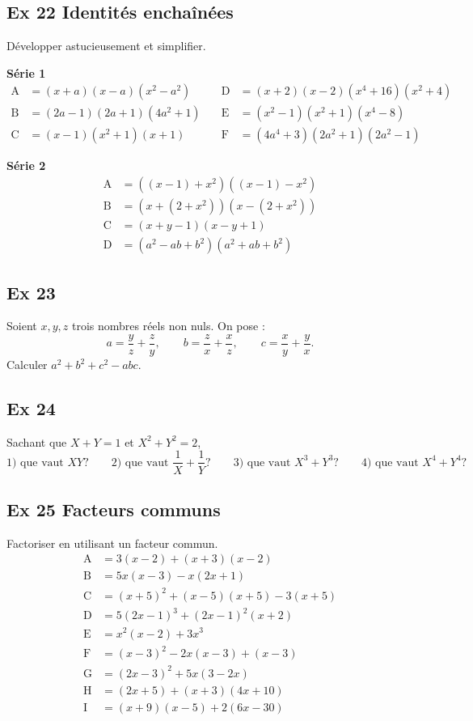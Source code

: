 \documentclass[a4paper,11pt]{article}
\begin{document}
\subsection*{Ex 22 \; Identités enchaînées}
Développer astucieusement et simplifier.

\textbf{Série 1}
\[
\begin{aligned}
\mathrm{A}&=(x+a)(x-a)(x^{2}-a^{2}) &\quad \mathrm{D}&=(x+2)(x-2)(x^{4}+16)(x^{2}+4)\\
\mathrm{B}&=(2a-1)(2a+1)(4a^{2}+1) &\quad \mathrm{E}&=(x^{2}-1)(x^{2}+1)(x^{4}-8)\\
\mathrm{C}&=(x-1)(x^{2}+1)(x+1) &\quad \mathrm{F}&=(4a^{4}+3)(2a^{2}+1)(2a^{2}-1)
\end{aligned}
\]

\textbf{Série 2}
\[
\begin{aligned}
\mathrm{A}&=((x-1)+x^{2})((x-1)-x^{2})\\
\mathrm{B}&=(x+(2+x^{2}))(x-(2+x^{2}))\\
\mathrm{C}&=(x+y-1)(x-y+1)\\
\mathrm{D}&=(a^{2}-ab+b^{2})(a^{2}+ab+b^{2})
\end{aligned}
\]

\subsection*{Ex 23}
Soient \(x,y,z\) trois nombres réels non nuls. On pose :
\[
a=\frac{y}{z}+\frac{z}{y},\qquad
b=\frac{z}{x}+\frac{x}{z},\qquad
c=\frac{x}{y}+\frac{y}{x}.
\]
Calculer \(a^{2}+b^{2}+c^{2}-abc\).

\subsection*{Ex 24}
Sachant que \(X+Y=1\) et \(X^{2}+Y^{2}=2\),
\[
\text{1) que vaut }XY?\qquad
\text{2) que vaut } \frac{1}{X}+\frac{1}{Y} ?\qquad
\text{3) que vaut }X^{3}+Y^{3}?\qquad
\text{4) que vaut }X^{4}+Y^{4}?
\]

\subsection*{Ex 25 \; Facteurs communs}
Factoriser en utilisant un facteur commun.
\[
\begin{aligned}
\mathrm{A}&=3(x-2)+(x+3)(x-2)\\
\mathrm{B}&=5x(x-3)-x(2x+1)\\
\mathrm{C}&=(x+5)^{2}+(x-5)(x+5)-3(x+5)\\
\mathrm{D}&=5(2x-1)^{3}+(2x-1)^{2}(x+2)\\
\mathrm{E}&=x^{2}(x-2)+3x^{3}\\
\mathrm{F}&=(x-3)^{2}-2x(x-3)+(x-3)\\
\mathrm{G}&=(2x-3)^{2}+5x(3-2x)\\
\mathrm{H}&=(2x+5)+(x+3)(4x+10)\\
\mathrm{I}&=(x+9)(x-5)+2(6x-30)
\end{aligned}
\]
\end{document}
